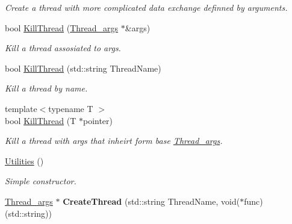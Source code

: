 \begin{DoxyCompactItemize}
\begin{DoxyCompactList}\small\item\em Create a thread with more complicated data exchange definned by arguments. \end{DoxyCompactList}\item 
\hypertarget{classUtilities_a6f1c1d53b9ce59bb26c56a3bebdbb255}{bool \hyperlink{classUtilities_a6f1c1d53b9ce59bb26c56a3bebdbb255}{Kill\-Thread} (\hyperlink{structThread__args}{Thread\-\_\-args} $\ast$\&args)}\label{classUtilities_a6f1c1d53b9ce59bb26c56a3bebdbb255}

\begin{DoxyCompactList}\small\item\em Kill a thread assosiated to args. \end{DoxyCompactList}\item 
\hypertarget{classUtilities_a8c17a46ce33b0b647797f24bc859bd7a}{bool \hyperlink{classUtilities_a8c17a46ce33b0b647797f24bc859bd7a}{Kill\-Thread} (std\-::string Thread\-Name)}\label{classUtilities_a8c17a46ce33b0b647797f24bc859bd7a}

\begin{DoxyCompactList}\small\item\em Kill a thread by name. \end{DoxyCompactList}\item 
\hypertarget{classUtilities_af4091a68d8a27a3b806d029cc9b2135e}{{\footnotesize template$<$typename T $>$ }\\bool \hyperlink{classUtilities_af4091a68d8a27a3b806d029cc9b2135e}{Kill\-Thread} (T $\ast$pointer)}\label{classUtilities_af4091a68d8a27a3b806d029cc9b2135e}

\begin{DoxyCompactList}\small\item\em Kill a thread with args that inheirt form base \hyperlink{structThread__args}{Thread\-\_\-args}. \end{DoxyCompactList}\item 
\hypertarget{classUtilities_ab1676c9ce35cf347a73d16f1094e1271}{\hyperlink{classUtilities_ab1676c9ce35cf347a73d16f1094e1271}{Utilities} ()}\label{classUtilities_ab1676c9ce35cf347a73d16f1094e1271}

\begin{DoxyCompactList}\small\item\em Simple constructor. \end{DoxyCompactList}\item 
\hypertarget{classUtilities_ac9c2f86e8279a0341dcf8ce85a92c86b}{\hyperlink{structThread__args}{Thread\-\_\-args} $\ast$ {\bfseries Create\-Thread} (std\-::string Thread\-Name, void($\ast$func)(std\-::string))}\label{classUtilities_ac9c2f86e8279a0341dcf8ce85a92c86b}


\end{DoxyCompactItemize}
